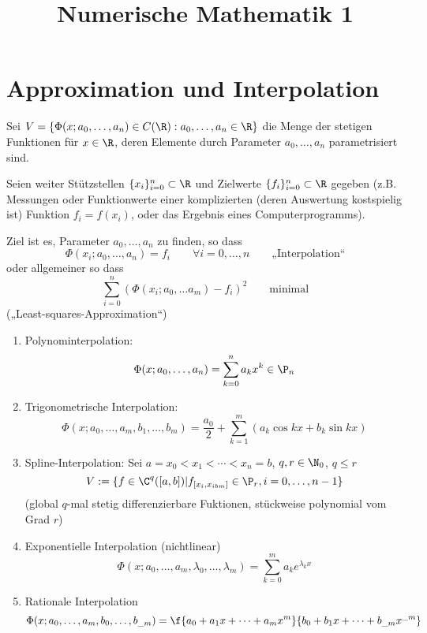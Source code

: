 \documentclass[11pt]{scrartcl}
\title{Numerische Mathematik 1}
\author{}
\begin{document}
\maketitle

\tableofcontents
\newpage

\section{Approximation und Interpolation}

Sei $V= \{\Phi(x;a_0,\dotsc, a_n) \in C(\R) : a_0,\dotsc,a_n\in \R\}$ die Menge der stetigen Funktionen für $x\in \R$, deren Elemente durch Parameter $a_0,\dotsc,a_n$ parametrisiert sind.

Seien weiter Stützstellen $\{x_i\}_{i=0}^n\subset \R$ und Zielwerte $\{f_i\}_{i=0}^n \subset \R$ gegeben (z.B. Messungen oder Funktionwerte einer komplizierten (deren Auswertung kostspielig ist) Funktion $f_i=f(x_i)$, oder das Ergebnis eines Computerprogramms).

Ziel ist es, Parameter $a_0,\dotsc, a_n$ zu finden, so dass
\[
	\Phi(x_i;a_0,\dotsc, a_n) = f_i \qquad \forall i= 0,\dotsc,n \qquad \text{„Interpolation“}
\]
oder allgemeiner so dass
\[
	\sum_{i=0}^n(\Phi(x_i; a_0,\dotsc a_m) -f_i)^2 \qquad \text{minimal}
\]
(„Least-squares-Approximation“)

\begin{ex*}
	\begin{enumerate}
		\item 
			Polynominterpolation:
			\[
				\Phi(x; a_0,\dotsc, a_n) = \sum_{k=0}^na_kx^k \in \P_n
			\]
		\item
			Trigonometrische Interpolation:
			\[
				\Phi ( x;a_0,\dots,a_m,b_1,\dots, b_m ) = \frac{a_{0}}{2} + \sum_{k=1}^m ( a_k \cos kx + b_k \sin kx )
			\]
		\item
			Spline-Interpolation:
			Sei $a=x_0< x_1 < \dotsb < x_n = b$, $q,r\in \N_0$, $q\le r$
			\[
			V := \{f\in \C^q([a,b]) | f_{[x_i,x_{ibm}]}\in \P_r, i=0,\dotsc,n-1\}
			\]
			(global $q$-mal stetig differenzierbare Fuktionen, stückweise polynomial vom Grad $r$)
		\item
			Exponentielle Interpolation (nichtlinear)
			\[
			\Phi(x;a_0,\dotsc, a_m,\lambda_0,\dotsc, \lambda_m) = \sum_{k=0}^m a_ke^{\lambda_k x}
			\]
		\item
			Rationale Interpolation
			\[
				\Phi(x; a_0,\dotsc, a_m, b_0,\dotsc, b_{\_m}) = \f {a_0 + a_1x + \dotsb + a_m x^m}{b_0 + b_1x + \dotsb + b_{\_m}x^{\_m}}
			\]
	\end{enumerate}
\end{ex*}
\end{document}
